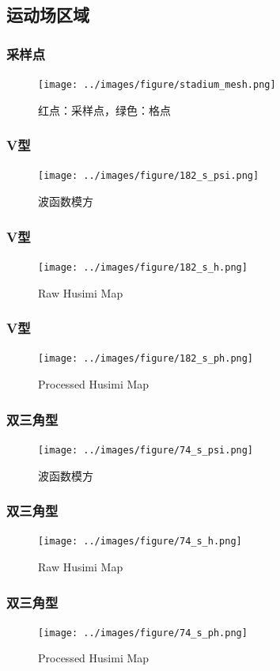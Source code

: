 \documentclass[UTF8]{beamer}
\begin{document}
\subsection{运动场区域}

\begin{frame}
	\frametitle{采样点}

	\begin{figure}
		\centering
		\texttt{[image: ../images/figure/stadium\_mesh.png]}
		\caption{红点：采样点，绿色：格点}
	\end{figure}

\end{frame}

\begin{frame}
	\frametitle{V型}
	\begin{figure}
		\centering
		\texttt{[image: ../images/figure/182\_s\_psi.png]}
		\caption{波函数模方}
	\end{figure}
\end{frame}

\begin{frame}
	\frametitle{V型}
	\begin{figure}
		\centering
		\texttt{[image: ../images/figure/182\_s\_h.png]}
		\caption{Raw Husimi Map}
	\end{figure}
\end{frame}

\begin{frame}
	\frametitle{V型}
	\begin{figure}
		\centering
		\texttt{[image: ../images/figure/182\_s\_ph.png]}
		\caption{Processed Husimi Map}
	\end{figure}
\end{frame}

\begin{frame}
	\frametitle{双三角型}
	\begin{figure}
		\centering
		\texttt{[image: ../images/figure/74\_s\_psi.png]}
		\caption{波函数模方}
	\end{figure}
\end{frame}

\begin{frame}
	\frametitle{双三角型}
	\begin{figure}
		\centering
		\texttt{[image: ../images/figure/74\_s\_h.png]}
		\caption{Raw Husimi Map}
	\end{figure}
\end{frame}

\begin{frame}
	\frametitle{双三角型}
	\begin{figure}
		\centering
		\texttt{[image: ../images/figure/74\_s\_ph.png]}
		\caption{Processed Husimi Map}
	\end{figure}
\end{frame}
\end{document}

